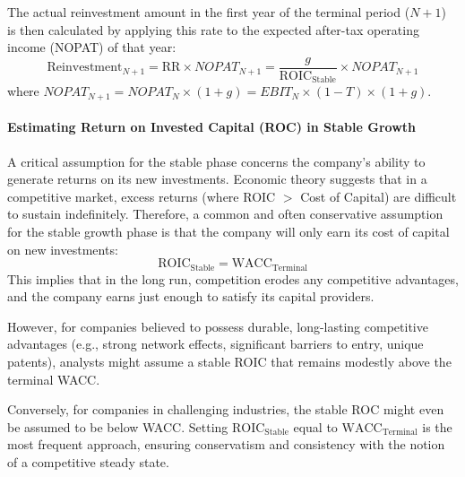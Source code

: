 The actual reinvestment amount in the first year of the terminal period (\(N+1\)) is then calculated by applying this rate to the expected after-tax operating income (NOPAT) of that year:
\begin{equation} \label{eq:reinvestment_amount_stable}
    \text{Reinvestment}_{N+1} = \text{RR} \times NOPAT_{N+1} = \frac{g}{\text{ROIC}_{\text{Stable}}} \times NOPAT_{N+1}
\end{equation}
where \(NOPAT_{N+1} = NOPAT_N \times (1+g) = EBIT_N \times (1-T) \times (1+g)\).

\paragraph{Estimating Return on Invested Capital (ROC) in Stable Growth}
A critical assumption for the stable phase concerns the company's ability to generate returns on its new investments. Economic theory suggests that in a competitive market, excess returns (where ROIC $>$ Cost of Capital) are difficult to sustain indefinitely. Therefore, a common and often conservative assumption for the stable growth phase is that the company will only earn its cost of capital on new investments:
\[ \text{ROIC}_{\text{Stable}} = \text{WACC}_{\text{Terminal}} \]
This implies that in the long run, competition erodes any competitive advantages, and the company earns just enough to satisfy its capital providers.

However, for companies believed to possess durable, long-lasting competitive advantages (e.g., strong network effects, significant barriers to entry, unique patents), analysts might assume a stable ROIC that remains modestly above the terminal WACC. 

Conversely, for companies in challenging industries, the stable ROC might even be assumed to be below WACC. Setting \(\text{ROIC}_{\text{Stable}}\) equal to \(\text{WACC}_{\text{Terminal}}\) is the most frequent approach, ensuring conservatism and consistency with the notion of a competitive steady state.

